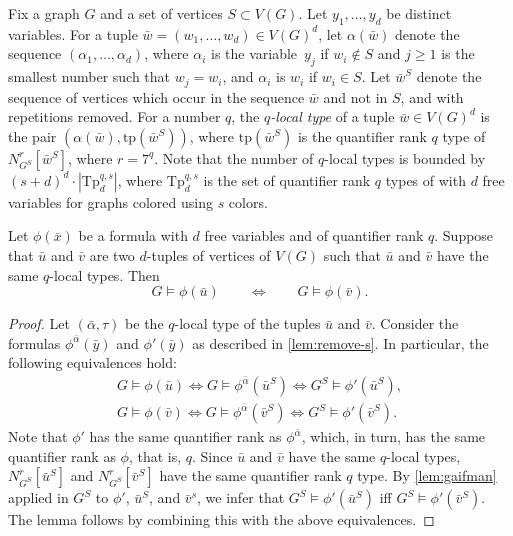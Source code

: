 Fix a graph $G$  and a set of vertices  $S\subset V(G)$.
%
Let $y_1,\ldots,y_d$ be distinct variables.
For a tuple $\bar w=(w_1,\ldots,w_d)\in V(G)^d$, let 
$\alpha(\bar w)$ denote the sequence 
 $(\alpha_1,\ldots,\alpha_d)$,
 where $\alpha_i$ is the variable~$y_j$
 if $w_i\not\in S$ and $j\ge 1$  
 is the smallest number such that $w_j=w_i$,
 and $\alpha_i$ is $w_i$ if $w_i\in S$.
Let $\bar w^S$ denote the sequence of vertices
which occur in the sequence $\bar w$ and not in $S$, and with repetitions removed.
For a number $q$, the \emph{$q$-local type} of a tuple $\bar w\in V(G)^d$
is the pair $(\alpha(\bar w),\mathrm{tp}(\bar w^S))$,
where $\mathrm{tp}(\bar w^S)$ is the quantifier rank $q$
type of  $N^r_{G^S}[\bar w^S]$, where $r=7^q$.
Note that the number of $q$-local types is bounded by 
$(s+d)^d\cdot |\mathrm{Tp}^{q,s}_{d}|$,
where $\mathrm{Tp}^{q,s}_{d}$
is the set of quantifier rank $q$ types of 
with $d$ free variables for graphs colored using $s$ colors.




\begin{lemma}\label{lem:coloring}
	Let $\phi(\bar x)$ be a formula with
	 $d$ free variables and of quantifier rank $q$.
	Suppose that $\bar u$ and $\bar v$ are two  $d$-tuples of 
	vertices of $V(G)$ such that  $\bar u$ and $\bar v$ have the same $q$-local types. Then $$G\models \phi(\bar u)\qquad \iff\qquad G\models \phi(\bar v).$$
\end{lemma}
\begin{proof}
Let $(\bar \alpha,\tau)$ be the $q$-local type of the tuples $\bar u$ and $\bar v$.
	Consider the formulas $\phi^{\bar \alpha}(\bar y)$ and $\phi'(\bar y)$ as described in \cref{lem:remove-s}.
	In particular, the following equivalences hold:
	\begin{align*}
	G\models\phi(\bar u)\iff G\models\phi^{\bar\alpha}(\bar u^S)\iff G^S\models\phi'(\bar u^S),\\
	G\models\phi(\bar v)\iff G\models\phi^{\bar\alpha}(\bar v^S)\iff G^S\models\phi'(\bar v^S).
	\end{align*}
		Note that $\phi'$ has the same quantifier rank as $\phi^{\bar \alpha}$, which, in turn, has the same quantifier rank as $\phi$, that is, $q$. 
		Since $\bar u$ and $\bar v$ have the same $q$-local types, $N^r_{G^S}[\bar u^S]$ and $N^r_{G^S}[\bar v^S]$ have the same quantifier rank $q$ type.
		By \cref{lem:gaifman} applied in $G^S$ to $\phi'$, $\bar u^S$, and $\bar v^s$, we infer that $G^S\models\phi'(\bar u^S)$ iff $G^S\models\phi'(\bar v^S)$.
		The lemma follows by combining this with the above equivalences.
\end{proof}

